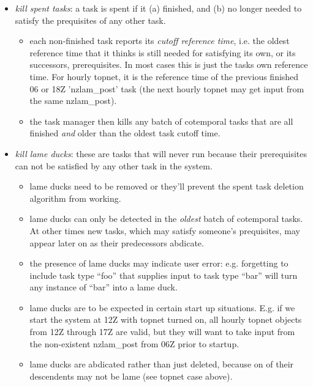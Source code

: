 \documentclass[12pt]{article}
\begin{document}
\begin{itemize}
\begin{itemize}
    \item {\em kill spent tasks}: a task is spent if it (a) finished,
    and (b) no longer needed to satisfy the prequisites of any other
    task.
       \begin{itemize}

       \item each non-finished task reports its {\em cutoff reference
       time}, i.e. the oldest reference time that it thinks is still
       needed for satisfying its own, or its successors, prerequisites.
       In most cases this is just the tasks own reference time. For
       hourly topnet, it is the reference time of the previous finished
       06 or 18Z 'nzlam\_post' task (the next hourly topnet may get
       input from the same nzlam\_post).  

       \item the task manager then kills any batch of cotemporal tasks
       that are all finished {\em and} older than the oldest task cutoff
       time.

       \end{itemize}

    \item {\em kill lame ducks}: these are tasks that will never run
    because their prerequisites can not be satisfied by any other task
    in the system.  

       \begin{itemize}
       \item lame ducks need to be removed or they'll prevent the spent
       task deletion algorithm from working.
       
       \item lame ducks can only be detected in the {\em oldest} batch
       of cotemporal tasks. At other times new tasks, which may satisfy
       someone's prequisites, may appear later on as their predecessors
       abdicate.

       \item the presence of lame ducks may indicate user error: e.g.
       forgetting to include task type ``foo'' that supplies input to
       task type ``bar'' will turn any instance of ``bar'' into a lame
       duck.

       \item lame ducks are to be expected in certain start up
       situations. E.g. if we start the system at 12Z with topnet turned
       on, all hourly topnet objects from 12Z through 17Z are valid, but
       they will want to take input from the non-existent nzlam\_post
       from 06Z prior to startup.

       \item lame ducks are abdicated rather than just deleted, because
       on of their descendents may not be lame (see topnet case above). 
       \end{itemize}
   \end{itemize}
\end{itemize}
\end{document}
